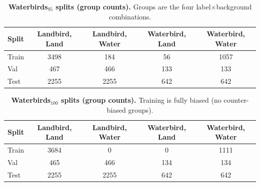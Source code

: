 \documentclass[10pt,twocolumn,letterpaper]{article}
\begin{document}
\begin{table}[h]
\centering
\caption{\textbf{DecoyMNIST class-balanced splits (counts per digit).} Validation is a stratified 10\% slice from the original training split.}
\label{tab:splits_decoymnist}
\scriptsize
\setlength{\tabcolsep}{3pt}
\renewcommand{\arraystretch}{1.15}
\end{table}

\begin{table}[h]
\centering
\caption{\textbf{Waterbirds$_{95}$ splits (group counts).} Groups are the four label$\times$background combinations.}
\label{tab:splits_waterbirds95}
\scriptsize
\setlength{\tabcolsep}{4pt}
\renewcommand{\arraystretch}{1}
\begin{tabular}{l cccc}
\toprule
\textbf{Split} &
\textbf{Landbird, Land} &
\textbf{Landbird, Water} &
\textbf{Waterbird, Land} &
\textbf{Waterbird, Water} \\
\midrule
Train      & 3498 & 184 &  56 & 1057 \\
Val &  467 & 466 & 133 &  133 \\
Test       & 2255 & 2255 & 642 &  642 \\
\bottomrule
\end{tabular}
\end{table}

\begin{table}[h]
\centering
\caption{\textbf{Waterbirds$_{100}$ splits (group counts).} Training is fully biased (no counter-biased groups).}
\label{tab:splits_waterbirds100}
\scriptsize
\setlength{\tabcolsep}{4pt}
\renewcommand{\arraystretch}{1.15}
\begin{tabular}{l cccc}
\toprule
\textbf{Split} &
\textbf{Landbird, Land} &
\textbf{Landbird, Water} &
\textbf{Waterbird, Land} &
\textbf{Waterbird, Water} \\
\midrule
Train      & 3684 &   0 &   0 & 1111 \\
Val &  465 & 466 & 134 &  134 \\
Test       & 2255 & 2255 & 642 &  642 \\
\bottomrule
\end{tabular}
\end{table}
\end{document}
